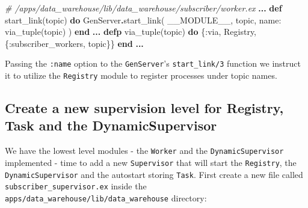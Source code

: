 \documentclass[
]{book}
\newenvironment{Shaded}{\begin{snugshade}}{\end{snugshade}}
\newcommand{\CommentTok}[1]{\textcolor[rgb]{0.56,0.35,0.01}{\textit{#1}}}
\newcommand{\ConstantTok}[1]{\textcolor[rgb]{0.00,0.00,0.00}{#1}}
\newcommand{\KeywordTok}[1]{\textcolor[rgb]{0.13,0.29,0.53}{\textbf{#1}}}
\newcommand{\NormalTok}[1]{#1}
\newcommand{\OperatorTok}[1]{\textcolor[rgb]{0.81,0.36,0.00}{\textbf{#1}}}
\newcommand{\VariableTok}[1]{\textcolor[rgb]{0.00,0.00,0.00}{#1}}
\begin{document}
\begin{Shaded}
\begin{Highlighting}[]
  \CommentTok{\# /apps/data\_warehouse/lib/data\_warehouse/subscriber/worker.ex}
  \OperatorTok{...}
  \KeywordTok{def}\NormalTok{ start\_link(topic) }\KeywordTok{do}
    \ConstantTok{GenServer}\OperatorTok{.}\NormalTok{start\_link(}
      \ConstantTok{\_\_MODULE\_\_}\NormalTok{,}
\NormalTok{      topic,}
      \VariableTok{name:}\NormalTok{ via\_tuple(topic)}
\NormalTok{    )}
  \KeywordTok{end}
  \OperatorTok{...}
  \KeywordTok{defp}\NormalTok{ via\_tuple(topic) }\KeywordTok{do}
\NormalTok{    \{}\VariableTok{:via}\NormalTok{, }\ConstantTok{Registry}\NormalTok{, \{}\VariableTok{:subscriber\_workers}\NormalTok{, topic\}\}}
  \KeywordTok{end}
  \OperatorTok{...}    
\end{Highlighting}
\end{Shaded}

Passing the \texttt{:name} option to the \texttt{GenServer}'s \texttt{start\_link/3} function we instruct it to utilize the \texttt{Registry} module to register processes under topic names.

\hypertarget{create-a-new-supervision-level-for-registry-task-and-the-dynamicsupervisor}{%
\subsection{Create a new supervision level for Registry, Task and the DynamicSupervisor}\label{create-a-new-supervision-level-for-registry-task-and-the-dynamicsupervisor}}

We have the lowest level modules - the \texttt{Worker} and the \texttt{DynamicSupervisor} implemented - time to add a new \texttt{Supervisor} that will start the \texttt{Registry}, the \texttt{DynamicSupervisor} and the autostart storing \texttt{Task}. First create a new file called \texttt{subscriber\_supervisor.ex} inside the \texttt{apps/data\_warehouse/lib/data\_warehouse} directory:
\end{document}
